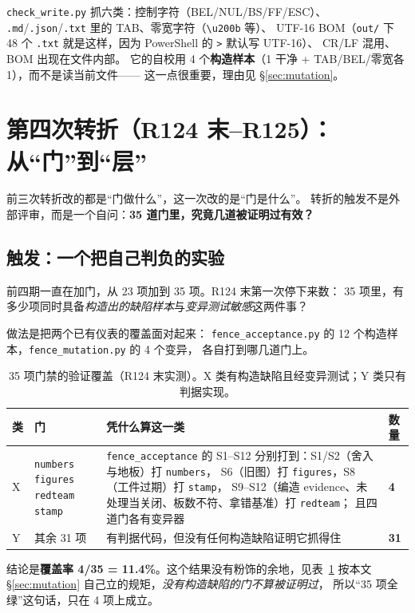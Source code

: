 \documentclass[11pt,a4paper]{article}
\newcommand{\code}[1]{\texttt{#1}}
\begin{document}
\code{check\_write.py} 抓六类：控制字符（BEL/NUL/BS/FF/ESC）、
\code{.md}/\code{.json}/\code{.txt} 里的 TAB、零宽字符（\code{\textbackslash u200b} 等）、
UTF-16 BOM（\code{out/} 下 48 个 \code{.txt} 就是这样，因为 PowerShell 的 \code{>} 默认写 UTF-16）、
CR/LF 混用、BOM 出现在文件内部。
它的自校用 4 个\textbf{构造样本}（1 干净 + TAB/BEL/零宽各 1），而不是读当前文件——
这一点很重要，理由见 §\ref{sec:mutation}。

\section{第四次转折（R124 末--R125）：从“门”到“层”}\label{sec:layers}

前三次转折改的都是“门做什么”，这一次改的是“门是什么”。
转折的触发不是外部评审，而是一个自问：\textbf{35 道门里，究竟几道被证明过有效？}

\subsection{触发：一个把自己判负的实验}

前四期一直在加门，从 23 项加到 35 项。R124 末第一次停下来数：
35 项里，有多少项同时具备\emph{构造出的缺陷样本}与\emph{变异测试敏感}这两件事？

做法是把两个已有仪表的覆盖面对起来：
\code{fence\_acceptance.py} 的 12 个构造样本，\code{fence\_mutation.py} 的 4 个变异，
各自打到哪几道门上。

\begin{table}[tbp]\centering\small
\caption{35 项门禁的验证覆盖（R124 末实测）。X 类有构造缺陷且经变异测试；Y 类只有判据实现。}\label{tab:xy}
\setlength{\tabcolsep}{3pt}
\begin{tabular}{p{1.5cm}p{2.6cm}p{7.4cm}p{2.2cm}}
\toprule
类 & 门 & 凭什么算这一类 & 数量\\
\midrule
X & \code{numbers} \code{figures} \code{redteam} \code{stamp} &
\code{fence\_acceptance} 的 S1--S12 分别打到：S1/S2（舍入与地板）打 \code{numbers}，
S6（旧图）打 \code{figures}，S8（工件过期）打 \code{stamp}，
S9--S12（编造 evidence、未处理当关闭、板数不符、拿错基准）打 \code{redteam}；
且四道门各有变异器 & \textbf{4}\\
Y & 其余 31 项 & 有判据代码，但没有任何构造缺陷证明它抓得住 & \textbf{31}\\
\bottomrule
\end{tabular}
\end{table}

结论是\textbf{覆盖率 4/35 = 11.4\%}。这个结果没有粉饰的余地，见表~\ref{tab:xy}
按本文 §\ref{sec:mutation} 自己立的规矩，\emph{没有构造缺陷的门不算被证明过}，
所以“35 项全绿”这句话，只在 4 项上成立。
\end{document}
